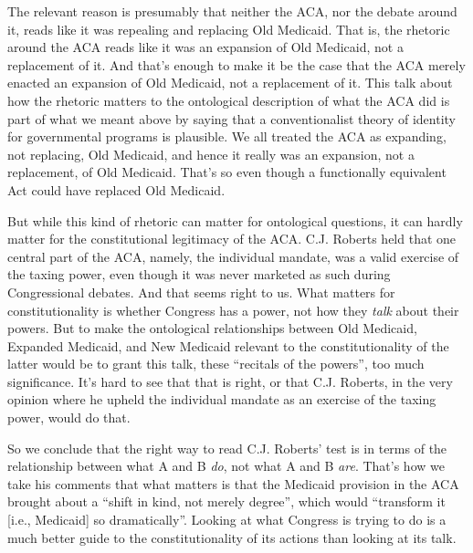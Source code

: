 \documentclass[
  11pt,
  letterpaper,
  DIV=11,
  numbers=noendperiod,
  oneside]{scrartcl}
\begin{document}
The relevant reason is presumably that neither the ACA, nor the debate
around it, reads like it was repealing and replacing Old Medicaid. That
is, the rhetoric around the ACA reads like it was an expansion of Old
Medicaid, not a replacement of it. And that's enough to make it be the
case that the ACA merely enacted an expansion of Old Medicaid, not a
replacement of it. This talk about how the rhetoric matters to the
ontological description of what the ACA did is part of what we meant
above by saying that a conventionalist theory of identity for
governmental programs is plausible. We all treated the ACA as expanding,
not replacing, Old Medicaid, and hence it really was an expansion, not a
replacement, of Old Medicaid. That's so even though a functionally
equivalent Act could have replaced Old Medicaid.

But while this kind of rhetoric can matter for ontological questions, it
can hardly matter for the constitutional legitimacy of the ACA. C.J.
Roberts held that one central part of the ACA, namely, the individual
mandate, was a valid exercise of the taxing power, even though it was
never marketed as such during Congressional debates. And that seems right to us. What
matters for constitutionality is whether Congress has a power, not how
they \emph{talk} about their powers. But to make the ontological
relationships between Old Medicaid, Expanded Medicaid, and New Medicaid
relevant to the constitutionality of the latter would be to grant this
talk, these ``recitals of the powers'', too much significance. It's hard
to see that that is right, or that C.J. Roberts, in the very opinion
where he upheld the individual mandate as an exercise of the taxing
power, would do that.

So we conclude that the right way to read C.J. Roberts' test is in terms
of the relationship between what A and B \emph{do}, not what A and B
\emph{are}. That's how we take his comments that what matters is that
the Medicaid provision in the ACA brought about a ``shift in kind, not
merely degree'', which would ``transform it {[}i.e., Medicaid{]} so
dramatically''. Looking at what Congress
is trying to do is a much better guide to the constitutionality of its
actions than looking at its talk.
\end{document}
